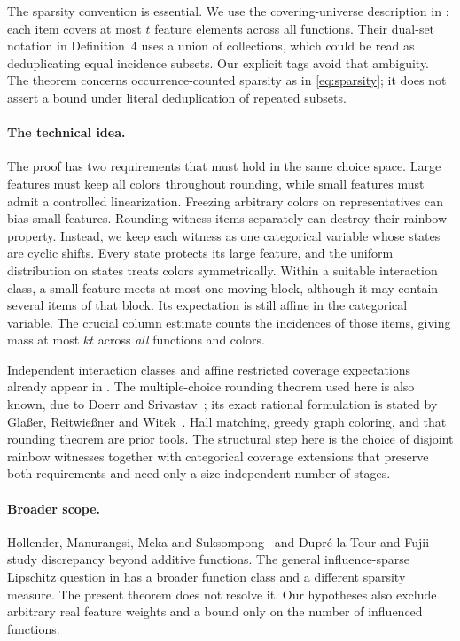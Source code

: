 \documentclass[acmsmall,11pt,nonacm]{acmart}
\begin{document}
The sparsity convention is essential. We use the covering-universe
description in \cite[Section~1.1]{ARW26}: each item covers at most $t$
feature elements across all functions. Their dual-set notation in
Definition~4 uses a union of collections, which could be read as
deduplicating equal incidence subsets. Our explicit tags avoid that
ambiguity. The theorem concerns occurrence-counted sparsity as in
\eqref{eq:sparsity}; it does not assert a bound under literal
deduplication of repeated subsets.

\paragraph{The technical idea.}
The proof has two requirements that must hold in the same choice space.
Large features must keep all colors throughout rounding, while small
features must admit a controlled linearization. Freezing arbitrary colors
on representatives can bias small features. Rounding witness items
separately can destroy their rainbow property. Instead, we keep each
witness as one categorical variable whose states are cyclic shifts.
Every state protects its large feature, and the uniform distribution on
states treats colors symmetrically. Within a suitable interaction class,
a small feature meets at most one moving block, although it may contain
several items of that block. Its expectation is still affine in the
categorical variable. The crucial column estimate counts the incidences
of those items, giving mass at most $kt$ across \emph{all} functions and
colors.

Independent interaction classes and affine restricted coverage
expectations already appear in \cite[Section~5, Lemma~23]{ARW26}. The
multiple-choice rounding theorem used here is also known, due to Doerr
and Srivastav~\cite{DS03}; its exact rational formulation is stated by
Gla{\ss}er, Reitwie{\ss}ner and Witek~\cite[Theorem~2]{GRW11}. Hall
matching, greedy graph coloring, and that rounding theorem are prior
tools. The structural step here is the choice of disjoint rainbow
witnesses together with categorical coverage extensions that preserve
both requirements and need only a size-independent number of stages.

\paragraph{Broader scope.}
Hollender, Manurangsi, Meka and Suksompong~\cite{HMMS25} and Dupr{\'e}
la Tour and Fujii~\cite{DF25} study discrepancy beyond additive functions.
The general influence-sparse Lipschitz question in
\cite[Definition~13 and Question~14]{HMMS25} has a broader function class
and a different sparsity measure. The present theorem does not resolve
it. Our hypotheses also exclude arbitrary real feature weights and a
bound only on the number of influenced functions.
\end{document}
